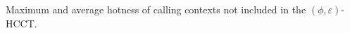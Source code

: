 \label{fig:hcct-uncovered} Maximum and average hotness of calling contexts not included in the $(\phi,\varepsilon)$-HCCT.
